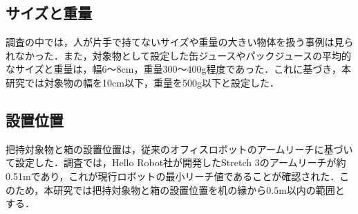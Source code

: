 \subsection{サイズと重量}
調査の中では，人が片手で持てないサイズや重量の大きい物体を扱う事例は見られなかった．また，対象物として設定した缶ジュースやパックジュースの平均的なサイズと重量は，幅6～8cm，重量300～400g程度であった．これに基づき，本研究では対象物の幅を10cm以下，重量を500g以下と設定した．
\subsection{設置位置}
把持対象物と箱の設置位置は，従来のオフィスロボットのアームリーチに基づいて設定した．調査では，Hello Robot社が開発したStretch 3のアームリーチが約0.51mであり，これが現行ロボットの最小リーチ値であることが確認された．このため，本研究では把持対象物と箱の設置位置を机の縁から0.5m以内の範囲とする．
\newpage